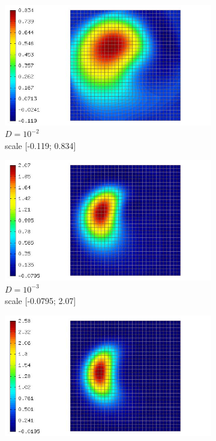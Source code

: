 \documentclass[mathserif]{beamer}
\begin{document}
\begin{frame}
\begin{figure}[H]
\begin{subfigure}[H]{0.02\textwidth}
	\end{subfigure}
	\begin{subfigure}[H]{0.3\textwidth}
		\centering
		\includegraphics[width=.9\textwidth, trim = 65mm 0mm 0mm 0mm, clip]{images/timedep-multiscale/convergence/1024_eps=001_100.jpg}
		\vspace{-3mm}
		\caption{$D = 10^{-2}$\\\vspace{-2mm}scale [-0.119; 0.834]}
	\end{subfigure}
	\begin{subfigure}[H]{0.3\textwidth}
		\centering
		\includegraphics[width=.9\textwidth, trim = 65mm 0mm 0mm 0mm, clip]{images/timedep-multiscale/convergence/1024_eps=0001_100.jpg}
		\vspace{-3mm}
		\caption{$D = 10^{-3}$\\\vspace{-2mm}scale [-0.0795; 2.07]}
	\end{subfigure}
	\begin{subfigure}[H]{0.3\textwidth}
		\centering
		\includegraphics[width=.9\textwidth, trim = 65mm 0mm 0mm 0mm, clip]{images/timedep-multiscale/convergence/1024_eps=0_100.jpg}

\end{subfigure}
\end{figure}
\end{frame}
\end{document}
